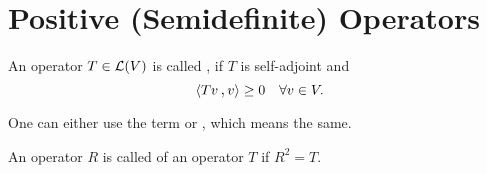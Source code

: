 \section{Positive (Semidefinite) Operators}

\begin{mydef}
  An operator $T \in \mathcal{L} (V)$ is called , if $T$ is self-adjoint and
  \[
  \ip{Tv}{v} \geq 0 \quad \forall v \in V.
  \]

  One can either use the term  or , which means the same.
\end{mydef}

\begin{mydef}
  An operator $R$ is called  of an operator $T$ if $R^2=T$.
\end{mydef}

